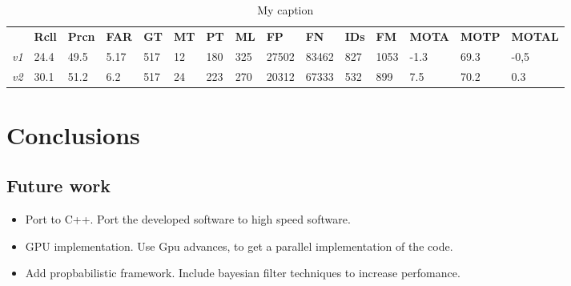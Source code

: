 \documentclass[12pt, a4paper, titlepage,twoside,openright]{article}
\begin{document}
\begin{table}[]
\centering
\caption{My caption}
\label{my-label}
\begin{tabular}{llll|llll|llll|lll}
            & \textbf{Rcll} & \textbf{Prcn} & \textbf{FAR} & \textbf{GT} & \textbf{MT} & \textbf{PT} & \textbf{ML} & \textbf{FP} & \textbf{FN} & \textbf{IDs} & \textbf{FM} & \textbf{MOTA} & \textbf{MOTP} & \textbf{MOTAL} \\
\textit{v1} & 24.4          & 49.5          & 5.17         & 517         & 12          & 180         & 325         & 27502       & 83462       & 827          & 1053        & -1.3          & 69.3          & -0,5           \\
\textit{v2} & 30.1          & 51.2          & 6.2          & 517         & 24          & 223         & 270         & 20312       & 67333       & 532          & 899         & 7.5           & 70.2          & 0.3           
\end{tabular}
\end{table}


\section{Conclusions}

\subsection{Future work}


\begin{itemize}

\item Port to C++. Port the developed software to high speed software.
\item GPU implementation. Use Gpu advances, to get a parallel implementation of the code.

\item Add propbabilistic framework. Include bayesian filter techniques to increase perfomance.


\end{itemize}

{}

\end{document}
